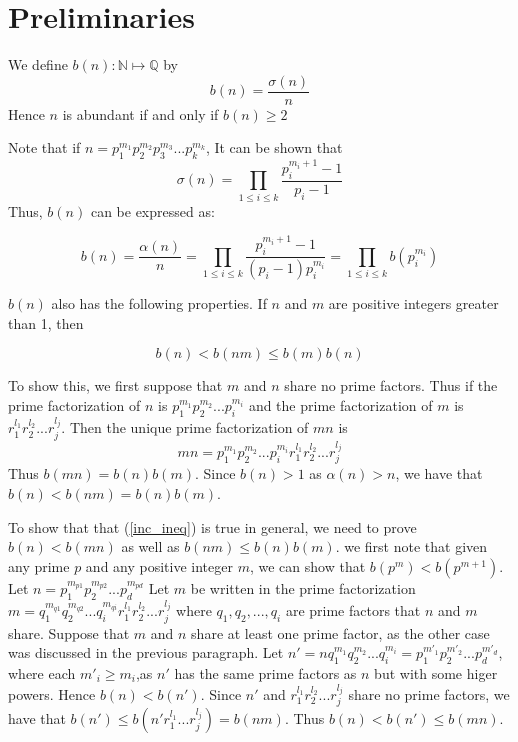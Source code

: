 \documentclass[../paper.tex]{article}
\begin{document}
\section{Preliminaries}

We define $b(n): \mathbb{N} \mapsto \mathbb{Q}$ by
%
$$b(n) = \frac{\sigma(n)}{n} $$
%
Hence $n$ is abundant if and only if $b(n) \geq 2$

Note that if $n=p_1^{m_1}p_2^{m_2}p_3^{m_3}...p_{k}^{m_k}$,
It can be shown that 
%
$$\sigma(n) = \prod_{1 \leq i \leq k} \frac{p_i^{m_i + 1} -1}{p_i -1}$$
%
Thus, $b(n)$ can be expressed as:

$$b(n) = \frac{\alpha(n)}{n} = \prod_{1 \leq i \leq k} 
\frac{p_i^{m_i + 1} -1}{(p_i -1)p_{i}^{m_{i}}}
%
=\prod_{1 \leq i \leq k} b(p_i^{m_i})
$$

$b(n)$ also has the following properties. If $n$ and $m$ are positive
integers greater than 1, then 

\begin{equation}\label{inc_ineq}
  b(n) < b(nm) \leq b(m)b(n)
\end{equation}

To show this, we first suppose that $m$ and $n$ share no prime factors.
Thus if the prime factorization of $n$ is $p_1^{m_1} p_2^{m_2} ... p_i^{m_i}$ 
and the prime factorization of $m$ is $r_1^{l_1} r_2^{l_2} ... r_j^{l_j}$.
Then the unique prime factorization of $mn$ is 
$$mn = p_1^{m_1} p_2^{m_2} ... p_i^{m_i} r_1^{l_1} r_2^{l_2} ... r_j^{l_j}$$
Thus $b(mn) = b(n)b(m)$. Since $b(n) > 1$ as $\alpha(n) > n$, we have that 
$b(n) < b(nm) = b(n)b(m)$. 

To show that that (\ref{inc_ineq}) is true in general, we need to prove 
$b(n) < b(mn)$ as well as $b(nm) \leq b(n) b(m)$.
we first note that given any prime $p$ and
any positive integer $m$, we can show that $b(p^m) < b(p^{m + 1})$.
Let $n = p_1^{m_{p1}} p_2^{m_{p2}}... p_d^{m_{pd}}$ 
Let $m$ be written in the prime factorization 
$m = q_1^{m_{q1}} q_2^{m_{q2}} ... q_i^{m_{qi}} 
r_1^{l_1} r_2^{l_2} ... r_j^{l_j}$ where 
$q_1, q_2, ..., q_i$ are prime factors that $n$ and $m$ share. 
Suppose that $m$ and $n$ share at least one prime factor, as the 
other case was discussed in the previous paragraph.
%
Let $n' = n q_1^{m_1} q_2^{m_2} ... q_i^{m_i} =
p_1^{m'_1} p_2^{m'_2} ... p_d^{m'_d}$, where each $m'_i \geq m_i$,as
$n'$ has the same prime factors as $n$ but with some higer powers.
Hence $b(n) < b(n')$. Since $n'$ and $r_1^{l_1} r_2^{l_2} ... r_j^{l_j}$
share no prime factors, we have that 
$b(n') \leq b(n' r_1^{l_1} ... r_j^{l_j}) = b(nm)$.
Thus $b(n) < b(n') \leq b(mn)$.
\end{document}
